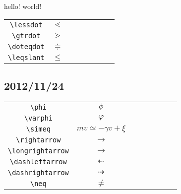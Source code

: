 \documentclass{jsarticle}
\begin{document}
\begin{center}
hello! world!
\begin{tabular}{cc|cc|cc|cc}
\verb+\lessdot+  & $\lessdot$ \\
\verb+\gtrdot+   & $\gtrdot$ \\
\verb+\doteqdot+ & $\doteqdot$ \\
\verb+\leqslant+ & $\leqslant$ \\
\end{tabular}


\subsection{2012/11/24}
\begin{tabular}{cc|cc|cc|cc}
\verb+\phi+  & $\phi$ \\
\verb+\varphi+  & $\varphi$ \\
\verb+\simeq+  & $mv\simeq-\gamma v+\xi$ \\
\verb+\rightarrow+  & $\rightarrow$ \\
\verb+\longrightarrow+  & $\longrightarrow$ \\
\verb+\dashleftarrow+  & $\dashleftarrow$ \\
\verb+\dashrightarrow+  & $\dashrightarrow$ \\
\verb+\neq+  & $\neq$ \\
\end{tabular}


\end{center}
\end{document}
